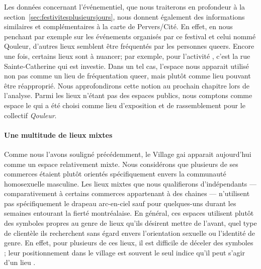 Les données concernant l'événementiel, que nous traiterons en profondeur à la section~\ref{sec:festivitesplusieursjours}, nous donnent également des informations similaires et complémentaires à la carte de Pervers/Cité.
En effet, en nous penchant par exemple sur les événements organisés par ce festival et celui nommé Qouleur, d'autres lieux semblent être fréquentés par les personnes queers.
Encore une fois, certains lieux sont à nuancer; par exemple, pour l'activité , c'est la rue Sainte-Catherine qui est investie.
Dans un tel cas, l'espace nous apparait utilisé non pas comme un lieu de fréquentation queer, mais plutôt comme lieu pouvant être réapproprié.
Nous approfondirons cette notion au prochain chapitre lors de l'analyse.
Parmi les lieux n'étant pas des espaces publics, nous comptons comme espace le \mai{} qui a été choisi comme lieu d'exposition et de rassemblement pour le collectif \emph{Qouleur}.

\paragraph{Une multitude de lieux mixtes}
Comme nous l'avons souligné précédemment, le Village gai apparait aujourd'hui comme un espace relativement mixte.
Nous considérons que plusieurs de ses commerces étaient plutôt orientés spécifiquement envers la communauté homosexuelle masculine.
Les lieux mixtes que nous qualifierons d'indépendants --- comparativement à certains commerces appartenant à des chaines --- n'utilisent pas spécifiquement le drapeau arc-en-ciel sauf pour quelques-uns durant les semaines entourant la fierté montréalaise.
En général, ces espaces utilisent plutôt des symboles propres au genre de lieux qu'ils désirent mettre de l'avant, quel type de clientèle ils recherchent sans égard envers l'orientation sexuelle ou l'identité de genre.
En effet, pour plusieurs de ces lieux, il est difficile de déceler des symboles \lgbt{}; leur positionnement dans le village est souvent le seul indice qu'il peut s'agir d'un lieu \lgbt{}.

